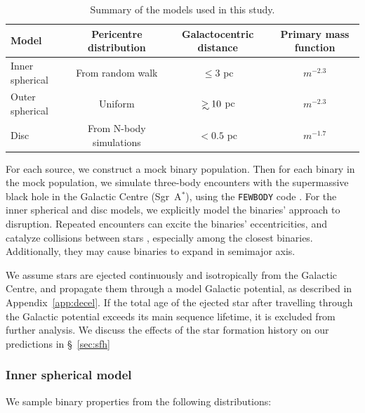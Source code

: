 \documentclass[fleqn,usenatbib]{mnras}
\def\sgra{Sgr~A$^*$}
\newcommand\gsim{\mathrel{\rlap{\lower4pt\hbox{\hskip1pt$\sim$}}
    \raise1pt\hbox{$>$}}}
\begin{document}
\begin{table}
     \caption{Summary of the models used in this study.}
    \begin{tabular}{l|c|c|c}
        Model & Pericentre distribution & Galactocentric distance & Primary mass function\\ 
        \hline
        \hline
        Inner spherical & From random walk & $\leq 3$ pc & $m^{-2.3}$\\ 
        Outer spherical & Uniform          & $\gsim 10$ pc & $m^{-2.3}$\\
        Disc            & From N-body simulations & $< 0.5$ pc & $m^{-1.7}$\\
        \hline
    \end{tabular}
    \label{tab:models}
\end{table}

For each source, we construct a mock binary population. Then for each binary in the mock population, we simulate three-body encounters with the supermassive black hole in the Galactic Centre (\sgra), using the \texttt{FEWBODY} code \citep{fregeau+2004}. For the inner spherical and disc models, we explicitly model the binaries' approach to disruption. Repeated encounters can excite the binaries' eccentricities, and catalyze collisions between stars \citep{bradnick+2017}, especially among the closest binaries. Additionally, they may cause binaries to expand in semimajor axis.

We assume stars are ejected continuously and isotropically from the Galactic Centre, and propagate them through a model Galactic potential, as described in Appendix~\ref{app:decel}. If the total age of the ejected star after travelling through the Galactic potential exceeds its main sequence lifetime, it is excluded from further analysis.  We discuss the effects of the star formation history on our predictions in \S~\ref{sec:sfh}

\subsubsection{Inner spherical model}
\label{sec:sphere}
We sample binary properties from the following distributions:
\end{document}
